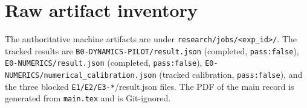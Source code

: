 \documentclass[11pt,a4paper]{article}
\newcommand{\code}[1]{\texttt{#1}}
\begin{document}
\section{Raw artifact inventory}
\label{sec:artifacts}

The authoritative machine artifacts are under
\code{research/jobs/<exp\_id>/}. The tracked results are
\code{B0-DYNAMICS-PILOT/result.json} (completed, \code{pass:false}),
\code{E0-NUMERICS/result.json} (completed, \code{pass:false}),
\code{E0-NUMERICS/numerical\_calibration.json} (tracked calibration,
\code{pass:false}), and the three blocked
\code{E1/E2/E3-*}/result.json files. The PDF of the main record is generated
from \code{main.tex} and is Git-ignored.
\end{document}
